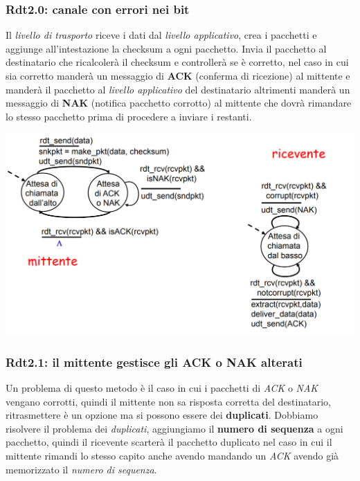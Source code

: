 \subsubsection*{Rdt2.0: canale con errori nei bit}
Il \textit{livello di trasporto} riceve i dati dal \textit{livello applicativo}, crea i pacchetti e aggiunge all'intestazione la checksum a ogni pacchetto. 
Invia il pacchetto al destinatario che ricalcolerà il checksum e controllerà se è corretto, nel caso in cui sia corretto manderà un messaggio di \textbf{ACK} (conferma di ricezione) al mittente e manderà il pacchetto al \textit{livello applicativo} del destinatario altrimenti manderà un messaggio di \textbf{NAK} (notifica pacchetto corrotto) al mittente che dovrà rimandare lo stesso pacchetto prima di procedere a inviare i restanti.

\includegraphics[width=\textwidth]{./img/rdt2.0.png} \\

\subsubsection*{Rdt2.1: il mittente gestisce gli ACK o NAK alterati}
Un problema di questo metodo è il caso in cui i pacchetti di \textit{ACK} o \textit{NAK} vengano corrotti, quindi il mittente non sa risposta corretta del destinatario, ritrasmettere è un opzione ma si possono essere dei \textbf{duplicati}. 
Dobbiamo risolvere il problema dei \textit{duplicati}, aggiungiamo il \textbf{numero di sequenza} a ogni pacchetto, quindi il ricevente scarterà il pacchetto duplicato nel caso in cui il mittente rimandi lo stesso capito anche avendo mandando un \textit{ACK} avendo già memorizzato il \textit{numero di sequenza}. \newline

